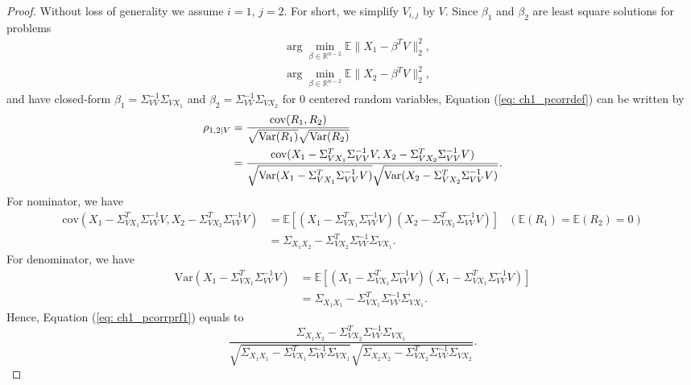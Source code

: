 \begin{proof}
    Without loss of generality we assume $i=1$, $j=2$. For short, we simplify $V_{i,j}$ by $V$. 
    Since $\beta_1$ and $\beta_2$ are least square solutions for problems
    \begin{align*}
        &\arg\min_{\beta\in\mathbb{R}^{n-2}} \mathbb{E}\|X_1-\beta^TV\|_2^2, \\
        &\arg\min_{\beta\in\mathbb{R}^{n-2}} \mathbb{E}\|X_2-\beta^TV\|_2^2,
    \end{align*}
    and have closed-form $\beta_1=\Sigma_{VV}^{-1}\Sigma_{VX_1}$ and $\beta_2=\Sigma_{VV}^{-1}\Sigma_{VX_2}$ for 0 centered random variables, 
    Equation (\ref{eq: ch1_pcorrdef}) can be written by 
    \begin{align}
        \label{eq: ch1_pcorrprf1}
        \rho_{1,2|V} &= \frac{\text{cov}(R_1,R_2)}{\sqrt{\text{Var}(R_1)}\sqrt{\text{Var}(R_2)}} \notag \\
                     &= \frac{\text{cov}(X_1-\Sigma_{VX_1}^T\Sigma_{VV}^{-1}V, X_2-\Sigma_{VX_2}^T\Sigma_{VV}^{-1}V)}{\sqrt{\text{Var}(X_1-\Sigma_{VX_1}^T\Sigma_{VV}^{-1}V)}\sqrt{\text{Var}(X_2-\Sigma_{VX_2}^T\Sigma_{VV}^{-1}V)}}.
    \end{align}
    For nominator, we have 
    \begin{align*}
        \text{cov}(X_1-\Sigma_{VX_1}^T\Sigma_{VV}^{-1}V, X_2-\Sigma_{VX_2}^T\Sigma_{VV}^{-1}V) &= \mathbb{E}\left[(X_1-\Sigma_{VX_1}^T\Sigma_{VV}^{-1}V)(X_2-\Sigma_{VX_2}^T\Sigma_{VV}^{-1}V)\right] & (\mathbb{E}(R_1)=\mathbb{E}(R_2)=0) \\
                                                                                               &= \Sigma_{X_1X_2} - \Sigma_{VX_2}^{T}\Sigma_{VV}^{-1}\Sigma_{VX_1}.
    \end{align*}
    For denominator, we have 
    \begin{align*}
        \text{Var}(X_1-\Sigma_{VX_1}^T\Sigma_{VV}^{-1}V) &= \mathbb{E}\left[(X_1-\Sigma_{VX_1}^T\Sigma_{VV}^{-1}V)(X_1-\Sigma_{VX_1}^T\Sigma_{VV}^{-1}V)\right] \\
                                                         &= \Sigma_{X_1X_1} -\Sigma_{VX_1}^T\Sigma_{VV}^{-1}\Sigma_{VX_1}.
    \end{align*}
    Hence, Equation (\ref{eq: ch1_pcorrprf1}) equals to 
    \begin{equation}
        \label{eq: ch1_pcorrprf2}
        \frac{\Sigma_{X_1X_2} - \Sigma_{VX_2}^{T}\Sigma_{VV}^{-1}\Sigma_{VX_1}}{\sqrt{\Sigma_{X_1X_1} -\Sigma_{VX_1}^T\Sigma_{VV}^{-1}\Sigma_{VX_1}}\sqrt{\Sigma_{X_2X_2} - \Sigma_{VX_2}^{T}\Sigma_{VV}^{-1}\Sigma_{VX_2}}}.

\end{equation}
\end{proof}
